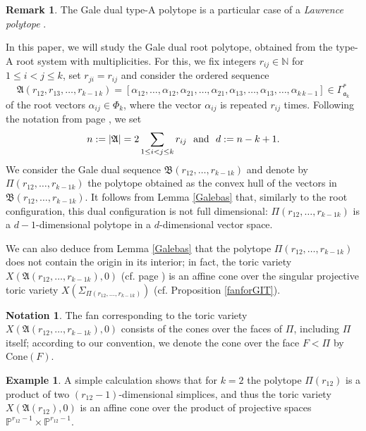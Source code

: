 \documentclass[11pt]{article}
\theoremstyle{definition}
\newtheorem{exam}[theo]{Example}
\newtheorem{rema}[theo]{Remark}
\newtheorem{nota}[theo]{Notation}
\numberwithin{equation}{section}
\newcommand{\cone}{\mathrm{Cone}}
\newcommand{\A}{\mathfrak{A}}
\newcommand{\B}{\mathfrak{B}}
\newcommand{\ak}{\mathfrak{a}_k}
\begin{document}
\begin{rema}
The Gale dual type-A polytope is a particular case of a \textit{Lawrence 
polytope}  \cite{HSt}.
\end{rema}

In this paper, we will study the Gale dual root polytope, obtained from the type-A root system with multiplicities. For this, we fix integers  $r_{ij}\in\mathbb{N}$ for $ 1\leq i< j\leq k$, set $r_{ji}=r_{ij}$ and consider the ordered sequence 
\begin{equation}\label{A}
\A(r_{12},r_{13}, \ldots ,r_{k-1\,k}) = 
[\alpha_{12}, \ldots ,\alpha_{12},\alpha_{21}, \ldots ,\alpha_{21},\alpha_{13}, \ldots ,\alpha_{13}, \ldots ,\alpha_{k\,
 k-1}]\in\Gamma_{\ak}^*
\end{equation}
of the root vectors $\alpha_{ij}\in\Phi_k$, where the vector $\alpha_{ij}$ is 
repeated $r_{ij}$ times. Following the notation from page \pageref{seq:toric}, 
we set 
$$n:=|\A| = 2\sum_{1\leq i< j\leq k}r_{ij} \text{\,\, and \,\,} d: = n-k+1.$$
We consider the Gale dual sequence $\B(r_{12}, \ldots ,r_{k-1 k})$ and denote by 
$\Pi(r_{12}, \ldots ,r_{k-1 k})$ the polytope obtained as the convex hull of the 
vectors in $\B(r_{12}, \ldots ,r_{k-1 k})$. It follows from Lemma \ref{Galebas} 
that, similarly to the root configuration, this dual configuration is not full 
dimensional: $\Pi(r_{12}, \ldots ,r_{k-1 k})$ is a $d-1$-dimensional polytope in a 
$d$-dimensional vector space.



We can also deduce from Lemma \ref{Galebas} that the polytope $\Pi(r_{12}, \ldots ,r_{k-1 k})$ does not contain the origin in its interior;
in fact, the toric variety $X(\A(r_{12}, \ldots ,r_{k-1 k}), 0)$ (cf.  page 
\pageref{X_0def}) is an affine cone over the singular projective toric variety 
$X(\Sigma_{\Pi(r_{12}, \ldots ,r_{k-1 k})})$ (cf.  Proposition \ref{fanforGIT}).

\begin{nota}
The fan corresponding to the toric variety 
$X(\A(r_{12}, \ldots ,r_{k-1 k}), 0)$ consists of the cones over the faces of $\Pi$, 
including $\Pi$ itself; according to our convention, we denote the cone over 
the face $F<\Pi$ by $\cone(F)$.
\end{nota}

\begin{exam}\label{k=2space}
A simple calculation shows that for $k=2$  the polytope $\Pi(r_{12})$ is a product of two $(r_{12}-1)$-dimensional simplices, and thus the toric variety $X(\A(r_{12}), 0)$ is an affine cone over the product of projective spaces $\mathbb{P}^{r_{12}-1}\times\mathbb{P}^{r_{12}-1}$.
\end{exam}
\end{document}
